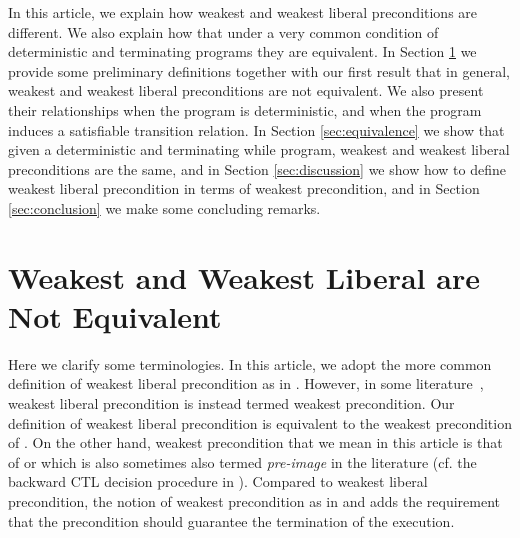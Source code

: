 \documentclass[times]{elsarticle}
\begin{document}
In this article, we explain how weakest and weakest liberal
preconditions are different. We also explain how that under a very
common condition of deterministic and terminating programs they are
equivalent. In Section \ref{sec:nonequivalence} we provide some
preliminary definitions together with our first result that in
general, weakest and weakest liberal preconditions are not equivalent.
We also present their relationships when the program is deterministic,
and when the program induces a satisfiable transition relation. In
Section \ref{sec:equivalence} we show that given a deterministic and
terminating while program, weakest and weakest liberal preconditions
are the same, and in Section \ref{sec:discussion} we show how to
define weakest liberal precondition in terms of weakest precondition,
and in Section \ref{sec:conclusion} we make some concluding remarks.

\section{Weakest and Weakest Liberal are Not Equivalent}
\label{sec:nonequivalence}

Here we clarify some terminologies. In this article, we adopt the more
common definition of weakest liberal precondition as in
\cite{dijkstra76lang}. However, in some
literature~\cite{bjornerinv97}, weakest liberal precondition is
instead termed weakest precondition. Our definition of weakest liberal
precondition is equivalent to the weakest precondition of
\cite{bjornerinv97}. On the other hand, weakest precondition that we
mean in this article is that of \cite{dijkstra75gcl} or
\cite{dijkstra76lang} which is also sometimes also termed
\emph{pre-image\/} in the literature (cf. the backward CTL decision
procedure in \cite{Huth:ModelChecking00}). Compared to weakest liberal
precondition, the notion of weakest precondition as in
\cite{dijkstra76lang} and \cite{dijkstra75gcl} adds the requirement
that the precondition should guarantee the termination of the
execution.
\end{document}
